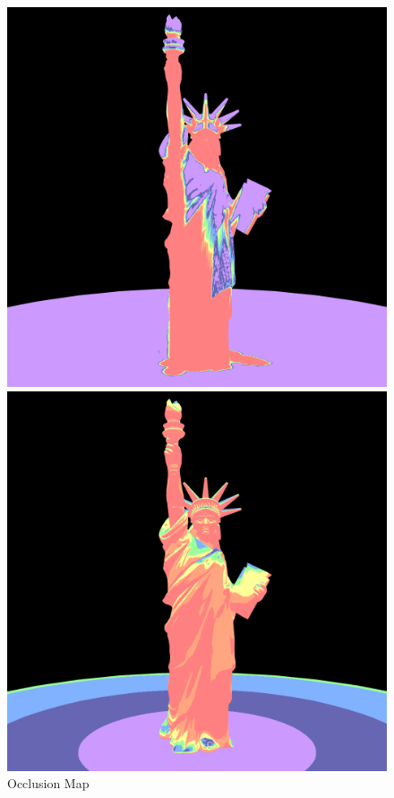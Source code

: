 \documentclass{article}
\begin{document}
\begin{figure}[h]
  \centering
  \begin{minipage}{0.33\textwidth}
      \centering
      \includegraphics[width=\textwidth]{images/OcclusionMap.png}
      \caption{Occlusion Map}
      \label{fig:OcclusionMap}
  \end{minipage}
  \begin{minipage}{0.33\textwidth}
      \centering
      \includegraphics[width=\textwidth]{images/InclinationMap.png}

\end{minipage}
\end{figure}
\end{document}
